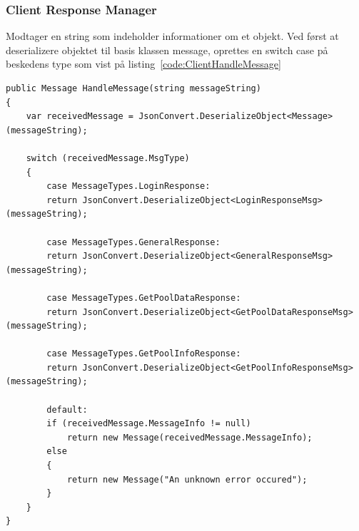 \subsubsection{Client Response Manager}
Modtager en string som indeholder informationer om et objekt. Ved først at deserializere objektet til basis klassen message, oprettes en switch case på beskedens type som vist på listing~\ref{code:ClientHandleMessage}
\begin{lstlisting}[caption=Client.HandleMessage,label=code:ClientHandleMessage]
public Message HandleMessage(string messageString)
{
	var receivedMessage = JsonConvert.DeserializeObject<Message>(messageString);
	
	switch (receivedMessage.MsgType)
	{
		case MessageTypes.LoginResponse:
		return JsonConvert.DeserializeObject<LoginResponseMsg>(messageString);
		
		case MessageTypes.GeneralResponse:
		return JsonConvert.DeserializeObject<GeneralResponseMsg>(messageString);
		
		case MessageTypes.GetPoolDataResponse:
		return JsonConvert.DeserializeObject<GetPoolDataResponseMsg>(messageString);
		
		case MessageTypes.GetPoolInfoResponse:
		return JsonConvert.DeserializeObject<GetPoolInfoResponseMsg>(messageString);
		
		default:
		if (receivedMessage.MessageInfo != null)
			return new Message(receivedMessage.MessageInfo);
		else
		{
			return new Message("An unknown error occured");
		}
	}
}
\end{lstlisting}